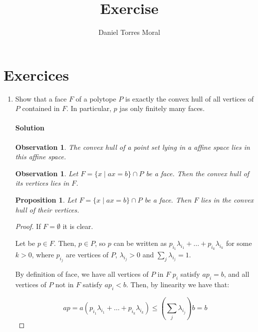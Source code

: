 \documentclass[a4paper,10pt]{article}
\title{Exercise}
\author{Daniel Torres Moral}
\newtheorem{prop}[theorem]{Proposition}
\newtheorem{obs}[theorem]{Observation}
\newcommand{\st}{ \; \left| \right. \;}
\begin{document}
  \maketitle
  
  \section{Exercices}
  
  \renewcommand{\theenumi}{(\arabic{enumi})}
  \begin{enumerate}
    \item Show that a face $F$ of a polytope $P$ is exactly the convex hull of all vertices of $P$ contained in $F$. In particular, $p$ jas only finitely many faces.
    
    \paragraph{Solution}
    
    \begin{obs}
      The convex hull of a point set lying in a affine space lies in this affine space.
    \end{obs}
    
    \begin{obs}
      Let  $F = \{ x \st a x = b \} \cap P$ be a face. Then the convex hull of its vertices lies in $F$.
    \end{obs}

    \begin{prop}
      Let $F = \{ x \st a x = b \} \cap P$ be a face. Then $F$ lies in the convex hull of their vertices.
    \end{prop}
    
    \begin{proof}
      If $F = \emptyset$ it is clear.
      
      Let be $p \in F$. Then, $p\in P$, so $p$ can be written as $ p_{i_1}\lambda_{i_1} + \dots + p_{i_k} \lambda_{i_k}$ for some $k>0$, where $p_{i_j}$ are vertices of $P$, $\lambda_{i_j} > 0$ and $\sum_j \lambda_{i_j} = 1$.
      
      By definition of face, we have all vertices of $P$ in $F$ $p_i$ satisfy $a p_i = b$, and all vertices of $P$ not in $F$ satisfy $a p_i < b$. Then, by linearity we have that:
      
      \begin{displaymath}
        a p = a ( p_{i_1}\lambda_{i_1} + \dots + p_{i_k} \lambda_{i_k} ) \leq ( \sum_j \lambda_{i_j}) b = b 
      \end{displaymath}


\end{proof}
\end{enumerate}
\end{document}
